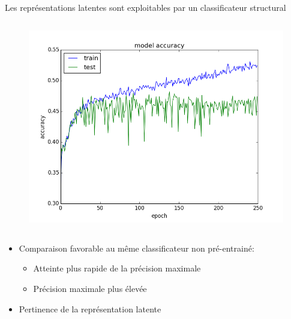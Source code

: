 \documentclass{beamer}
\begin{document}
\begin{frame}{Les représentations latentes sont exploitables par un
    classificateur structural}
\begin{columns}
    \begin{figure}
      \centering
      \includegraphics[scale=0.25]{../Figures/SupClass}
    \end{figure}

  \end{columns}

    \begin{itemize}
     
    \item Comparaison favorable au même classificateur non pré-entrainé:
      \begin{itemize}
      \item Atteinte plus rapide de la précision maximale\pause
      \item Précision maximale plus élevée\pause
      \end{itemize}
    \item Pertinence de la représentation latente
    \end{itemize}

 \end{frame}


\end{document}
